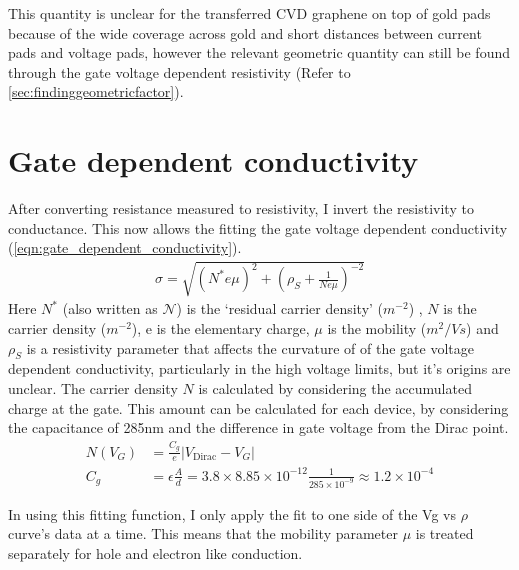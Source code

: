 \documentclass[../Matt_Gebert_Honours_Thesis.tex]{subfiles}
\begin{document}
This quantity is unclear for the transferred CVD graphene on top of gold pads because of the wide coverage across gold and short distances between current pads and voltage pads, however the relevant geometric quantity can still be found through the gate voltage dependent resistivity (Refer to \cref{sec:findinggeometricfactor}).

\section{Gate dependent conductivity}
After converting resistance measured to resistivity, I invert the resistivity to conductance. This now allows the fitting the gate voltage dependent conductivity (\cref{eqn:gate_dependent_conductivity}).
\begin{align}
\sigma = \sqrt{\left(N^{*} e \mu\right)^2 + \left(\rho_S + \frac{1}{N e \mu}\right)^{-2}} \label{eqn:gate_dependent_conductivity}
\end{align}
Here $N^{*}$ (also written as $\mathcal{N}$) is the `residual carrier density'  ($m^{-2}$) \cite{adam_self-consistent_2007}, $N$ is the carrier density ($m^{-2}$), e is the elementary charge, $\mu$ is the mobility ($m^2/Vs$) and $\rho_S$ is a resistivity parameter that affects the curvature of of the gate voltage dependent conductivity, particularly in the high voltage limits, but it's origins are unclear.
The carrier density $N$ is calculated by considering the accumulated charge at the gate. This amount can be calculated for each device, by considering the capacitance of 285nm \silicondioxide{} and the difference in gate voltage from the Dirac point.
\begin{align}
	N(V_G) &= \frac{C_g}{e} \left|V_{\text{Dirac}}-V_G\right|\\
	C_g &= \epsilon \frac{A}{d} = 3.8 \times 8.85 \times 10^{-12} \frac{1}{285\times 10^{-9}} \approx 1.2 \times 10^{-4}
\end{align}

In using this fitting function, I only apply the fit to one side of the Vg vs $\rho$ curve's data at a time. This means that the mobility parameter $\mu$ is treated separately for hole and electron like conduction. 
\end{document}
